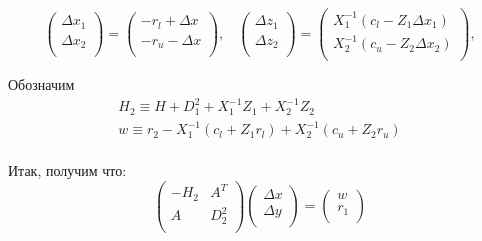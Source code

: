 \documentclass[a4paper, 12pt, titlepage]{article}
\theoremstyle{definition}
\theoremstyle{plain}
\theoremstyle{plain}
\begin{document}
\begin{equation}
 \left(
  \begin{array}{c}
   \Delta x_{1} \\
   \Delta x_{2} \\
   \end{array}
 \right) =
 \left(
  \begin{array}{c}
   -r_{l} + \Delta x \\
   -r_{u} - \Delta x \\
   \end{array}
 \right), \;\;\;
 \left(
  \begin{array}{c}
   \Delta z_{1} \\
   \Delta z_{2} \\
   \end{array}
 \right) =
 \left(
  \begin{array}{c}
   X_{1}^{-1} (c_{l} - Z_{1} \Delta x_{1}) \\
   X_{2}^{-1} (c_{u} - Z_{2} \Delta x_{2}) \\
   \end{array}
 \right),
\end{equation}

Обозначим
\begin{equation}
 \begin{aligned}
  H_{2} \equiv H + D_{1}^{2} + X_{1}^{-1} Z_{1} + X_{2}^{-1} Z_{2} \\
  w \equiv r_{2} - X_{1}^{-1} (c_{l} + Z_{1} r_{l})
  + X_{2}^{-1} (c_{u} + Z_{2} r_{u}) \\
 \end{aligned}
\end{equation}

Итак, получим что:
\begin{equation}
 \left(
  \begin{array}{cc}
   -H_{2} & A^{T} \\
   A & D_{2}^{2} \\
   \end{array}
 \right)
 \left(
  \begin{array}{c}
   \Delta x \\
   \Delta y \\
   \end{array}
 \right) =
 \left(
  \begin{array}{c}
   w \\
   r_{1} \\
   \end{array}
 \right)
\end{equation}




\newpage


\end{document}
